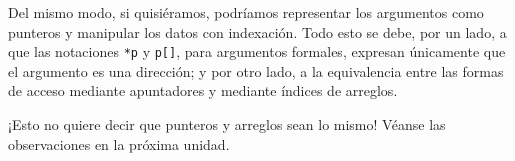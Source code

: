 Del mismo modo, si quisiéramos, podríamos representar los argumentos como
punteros y manipular los datos con indexación. Todo esto se debe, por un lado,
a que las notaciones \texttt{*p} y \texttt{p[]}, para argumentos formales, expresan únicamente que
el argumento es una dirección; y por otro lado, a la equivalencia entre las
formas de acceso mediante apuntadores y mediante índices de arreglos.

¡Esto no quiere decir que punteros y arreglos sean lo mismo! Véanse las
observaciones en la próxima unidad.


